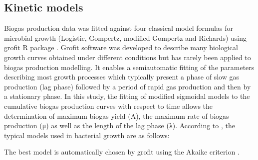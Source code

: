 \subsection{Kinetic models}
Biogas production data was fitted against four classical model formulas for microbial growth (Logistic, Gompertz, modified Gompertz and Richards) using grofit R package \cite{Kahm_2010}. Grofit software was developed to describe many biological growth curves obtained under different conditions but has rarely been applied to biogas production modelling. It enables a semiautomatic fitting of the parameters describing most growth processes which typically present a phase of slow gas production (lag phase) followed by a period of rapid gas production and then by a stationary phase. In this study, the fitting of modified sigmoidal models to the cumulative biogas production curves  with respect to time allows the determination of maximum biogas yield (A), the maximum rate of biogas production (μ) as well as the length of the lag phase (λ). According to \cite{Zwietering1990}, the typical models used in bacterial growth are as follows:

The best model is automatically chosen by grofit using the Akaike criterion \cite{Hasenbrink_2006}.